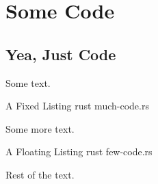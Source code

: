 \chapter{Some Code}
\section{Yea, Just Code}

Some text.

\fixedlisting
    {A Fixed Listing}
    {rust}
    {much-code.rs}

Some more text.

\floatinglisting
    {A Floating Listing}
    {rust}
    {few-code.rs}
    
Rest of the text.
